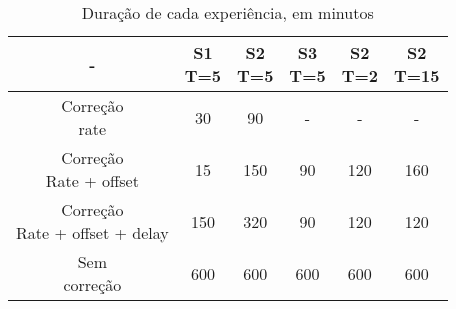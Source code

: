 \begin{table}[h]
\centering
\begin{tabular}{|c|c|c|c|c|c|}

\hline
 - & \makecell{S1 \\ T=5} & \makecell{S2 \\ T=5} & \makecell{S3 \\ T=5} & \makecell{S2 \\ T=2} & \makecell{S2 \\ T=15} \\ \hline
\makecell{Correção \\ rate}                  & 30  & 90   &  -  & -    & -    \\ \hline
\makecell{Correção \\ Rate + offset}         & 15  & 150  & 90  & 120  & 160  \\ \hline
\makecell{Correção \\ Rate + offset + delay} & 150 & 320  & 90  & 120  & 120  \\ \hline
\makecell{Sem \\ correção}                   & 600 & 600  & 600 & 600  & 600  \\ \hline
\end{tabular}
\caption{Duração de cada experiência, em minutos}
\label{tab:horas}
\end{table}

